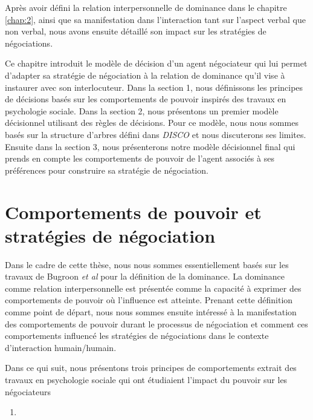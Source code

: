 Après avoir défini la relation interpersonnelle de dominance dans le chapitre \ref{chap:2}, ainsi que sa manifestation dans l'interaction tant sur l'aspect verbal que non verbal, nous avons ensuite détaillé son impact sur les stratégies de négociations. 

Ce chapitre introduit le modèle de décision d'un agent négociateur qui lui permet d'adapter sa stratégie de négociation à la relation de dominance qu'il vise à instaurer avec son interlocuteur. Dans la section 1, nous définissons les principes de décisions basés sur les comportements de pouvoir inspirés des travaux en psychologie sociale. Dans la section 2, nous présentons un premier modèle décisionnel utilisant des règles de décisions.  Pour ce modèle, nous nous sommes basés sur la structure d'arbres défini dans \emph{DISCO} \cite{ri} et nous discuterons ses limites. Ensuite dans la section 3, nous présenterons notre modèle décisionnel final qui prends en compte les comportements de pouvoir de l'agent associés à ses préférences pour construire sa stratégie de négociation. 

\section{Comportements de pouvoir et stratégies de négociation}

 Dans le cadre de cette thèse, nous nous sommes essentiellement basés sur les travaux de Bugroon \emph{et al} pour la définition de la dominance. 
 La dominance comme relation interpersonnelle est présentée comme la capacité à exprimer des comportements de pouvoir où l'influence est atteinte. Prenant cette définition comme point de départ, nous nous sommes ensuite intéressé à
 la manifestation des comportements de pouvoir durant le processus de négociation et comment ces comportements influencé les stratégies de négociations dans le contexte d'interaction humain/humain. 
 
 Dans ce qui suit, nous présentons trois principes de comportements extrait des travaux en psychologie sociale qui ont étudiaient l'impact du pouvoir sur les négociateurs
 
 \begin{enumerate}
 	\item 
 \end{enumerate}
 
 
 
 
